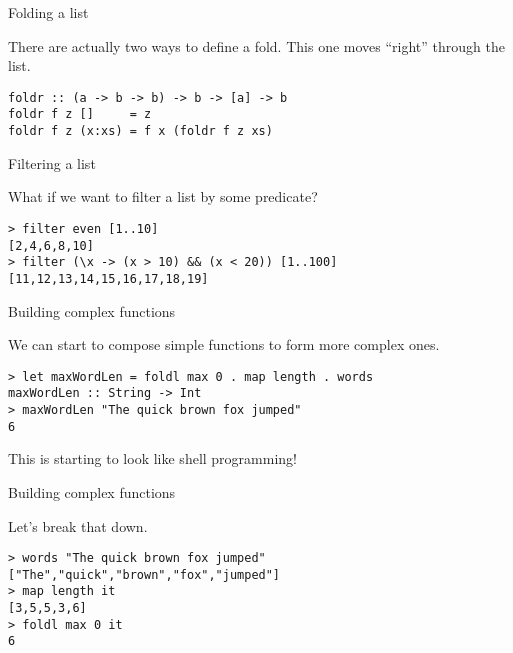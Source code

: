 %
\begin{frame}[fragile]{Folding a list}

There are actually two ways to define a fold. This one moves ``right'' through
the list.

\begin{block}{}
\begin{verbatim}
foldr :: (a -> b -> b) -> b -> [a] -> b
foldr f z []     = z 
foldr f z (x:xs) = f x (foldr f z xs)
\end{verbatim}
\end{block}

\end{frame}

%
\begin{frame}[fragile]{Filtering a list}

What if we want to filter a list by some predicate?

\begin{block}{}
\begin{verbatim}
> filter even [1..10]
[2,4,6,8,10]
> filter (\x -> (x > 10) && (x < 20)) [1..100]
[11,12,13,14,15,16,17,18,19]
\end{verbatim}
\end{block}

\end{frame}

%
\begin{frame}[fragile]{Building complex functions}

We can start to compose simple functions to form more complex ones.

\begin{block}{}
\begin{verbatim}
> let maxWordLen = foldl max 0 . map length . words
maxWordLen :: String -> Int
> maxWordLen "The quick brown fox jumped"
6
\end{verbatim}
\end{block}

This is starting to look like shell programming!

\end{frame}

%
\begin{frame}[fragile]{Building complex functions}

Let's break that down.

\begin{block}{}
\begin{verbatim}
> words "The quick brown fox jumped"
["The","quick","brown","fox","jumped"]
> map length it
[3,5,5,3,6]
> foldl max 0 it
6
\end{verbatim}
\end{block}

\end{frame}

